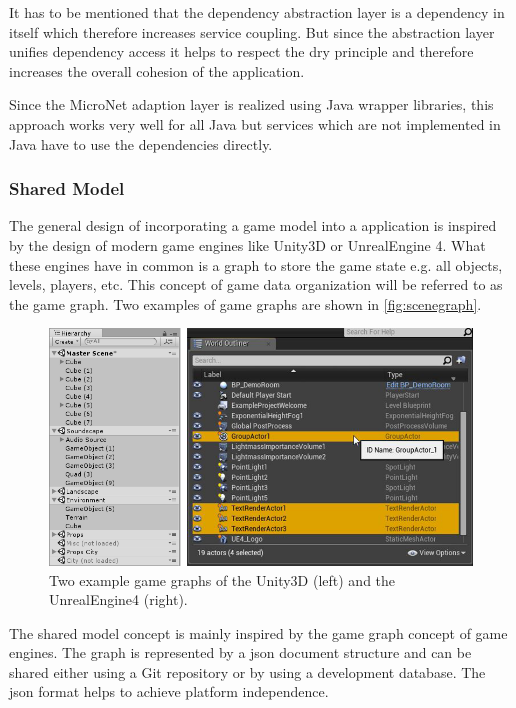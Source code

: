 It has to be mentioned that the dependency abstraction layer is a dependency in
itself which therefore increases service coupling. But since the abstraction
layer unifies dependency access it helps to respect the \gls{dry}
principle and therefore increases the overall cohesion of the application. 

Since the MicroNet adaption layer is realized using Java wrapper libraries,
this approach works very well for all Java \mss{} but services which are not
implemented in Java have to use the dependencies directly.

\subsubsection{Shared Model}
\label{subsub:shared_model}

The general design of incorporating a game model into a \mn{} application is
inspired by the design of modern game engines like Unity3D or UnrealEngine 4.
What these engines have in common is a graph to store the game state e.g. all
objects, levels, players, etc. This concept of game data organization will be
referred to as the game graph. Two examples of game graphs are shown in
\autoref{fig:scenegraph}.

\begin{figure}
  \centering
  \includegraphics[width=\textwidth]{images/game_engine/scenegraph}
  \caption{Two example game graphs of the Unity3D (left) and the UnrealEngine4
  (right).}
  \label{fig:scenegraph}
\end{figure}

The shared model concept is mainly inspired by the game graph concept of game
engines. The graph is represented by a \gls{json} document structure and can be shared
either using a Git repository or by using a development database. The \gls{json}
format helps to achieve platform independence.

